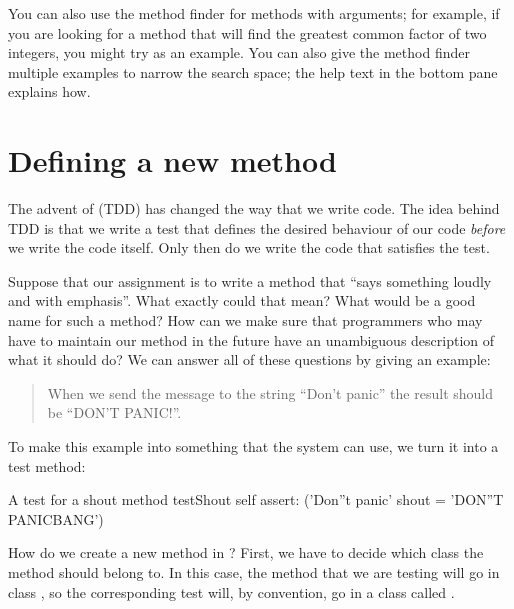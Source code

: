 \documentclass[a4paper,10pt,twoside]{book}
\begin{document}
You can also use the method finder for methods with arguments; for example, if you are looking for a method that will find the greatest common factor of two integers, you might try  as an example.  You can also give the method finder multiple examples to narrow the search space; the help text in the bottom pane explains how.

\section{Defining a new method}

The advent of \cite{Beck03a} (TDD) has changed the way that we write code.  
The idea behind TDD is that we write a test that defines the desired behaviour of our code \emph{before} we write the code itself.
Only then do we write the code that satisfies the test.

Suppose that our assignment is to write a method that ``says something loudly and with emphasis''.  What exactly could that mean?  What would be a good name for such a method?  How can we make sure  that programmers who may have to maintain our method in the future have an unambiguous description of what it should do?   We can answer all of these questions by giving an example:

\begin{quote}
When we send the message  to the string ``Don't panic'' the result should be ``DON'T PANIC!''.
\end{quote}

\noindent
To make this example into something that the system can use, we turn it into a test method:

\begin{method}[testShout]{A test for a shout method}
testShout
	self assert: ('Don''t panic' shout = 'DON''T PANICBANG')
\end{method} %

How do we create a new method in \pharo?   First, we have to decide which class the method should belong to.
In this case, the  method that we are testing will go in class , so the corresponding test will, by convention, go in a class called .
\end{document}

